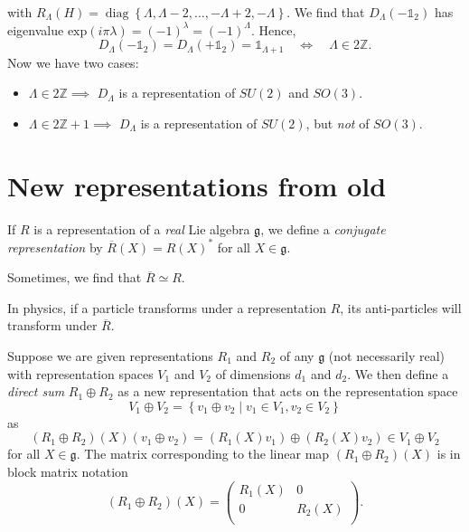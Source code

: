 with $R_\Lambda(H) = \operatorname{diag}\left\{ \Lambda, \Lambda-2, \dots, -\Lambda + 2, -\Lambda \right\}$.
We find that $D_\Lambda(-\mathbb{1}_2)$ has eigenvalue $\text{exp}(i\pi\lambda) = (-1)^{\lambda} = (-1)^\Lambda$. Hence, 
\begin{equation}
  D_\Lambda (-\mathbb{1}_2) = D_\Lambda (+\mathbb{1}_2) = \mathbb{1}_{\Lambda + 1} \quad \iff \quad \Lambda \in 2 \mathbb{Z}.
\end{equation}
Now we have two cases:
\begin{itemize}
  \item $\Lambda \in 2\mathbb{Z} \implies$ $D_\Lambda$ is a representation of $SU(2)$ and $SO(3)$.
  \item $\Lambda \in 2\mathbb{Z} + 1 \implies$ $D_\Lambda$ is a representation of $SU(2)$, but \emph{not} of $SO(3)$.
\end{itemize}

\section{New representations from old}%
\label{sec:new_representations_from_old}

\begin{definition}
  If $R$ is a representation of a \emph{real} Lie algebra $\mathfrak{g}$, we define a \emph{conjugate representation} by $\overline{R}{}(X) = R(X)^*$ for all $X \in \mathfrak{g}$.
\end{definition}
Sometimes, we find that $\overline{R}{} \simeq R$.
\begin{leftbar}
  \begin{remark}
    In physics, if a particle transforms under a representation $R$, its anti-particles will transform under $\overline{R}{}$.
  \end{remark}
\end{leftbar}

\begin{definition}
  Suppose we are given representations $R_1$ and $R_2$ of any $\mathfrak{g}$ (not necessarily real) with representation spaces $V_1$ and $V_2$ of dimensions $d_1$ and $d_2$. We then define a \emph{direct sum} $R_1 \oplus R_2$ as a new representation that acts on the representation space
  \begin{equation}
    V_1 \oplus V_2 = \left\{ v_1 \oplus v_2 \mid v_1 \in V_1, v_2 \in V_2 \right\}
  \end{equation}
  as 
  \begin{equation}
    (R_1 \oplus R_2)(X) (v_1 \oplus v_2) = (R_1(X) v_1) \oplus (R_2(X)v_2) \in V_1 \oplus V_2
  \end{equation}
  for all $X \in \mathfrak{g}$.
  The matrix corresponding to the linear map $(R_1 \oplus R_2)(X)$ is in block matrix notation
  \begin{equation}
    (R_1 \oplus R_2)(X)= 
    \begin{pmatrix}
      R_1(X) & 0 \\
      0 & R_2(X) \\
    \end{pmatrix}.
  \end{equation}
\end{definition}
